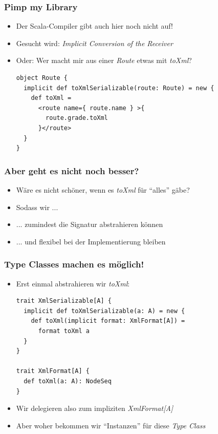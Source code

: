 \documentclass{beamer}
\begin{document}
\begin{frame}[fragile]
  \frametitle{Pimp my Library}
  \begin{itemize}
    \item Der Scala-Compiler gibt auch hier noch nicht auf!
    \item Gesucht wird: \emph{Implicit Conversion of the Receiver}
    \item Oder: Wer macht mir aus einer \emph{Route} etwas mit \emph{toXml}?
    \begin{lstlisting}
object Route {
  implicit def toXmlSerializable(route: Route) = new {
    def toXml =
      <route name={ route.name } >{ 
        route.grade.toXml
      }</route>
  }
}
    \end{lstlisting}
  \end{itemize}
\end{frame}

\begin{frame}[fragile]
  \frametitle{Aber geht es nicht noch besser?}
  \begin{itemize}
    \item W\"are es nicht sch\"oner, wenn es \emph{toXml} f\"ur ``alles'' g\"abe?
    \item Sodass wir ... 
    \item ... zumindest die Signatur abstrahieren k\"onnen
    \item ... und flexibel bei der Implementierung bleiben
  \end{itemize}
\end{frame}

\begin{frame}[fragile]
  \frametitle{Type Classes machen es m\"oglich!}
  \begin{itemize}
    \item Erst einmal abstrahieren wir \emph{toXml}:
    \begin{lstlisting}
trait XmlSerializable[A] {
  implicit def toXmlSerializable(a: A) = new {
    def toXml(implicit format: XmlFormat[A]) =
      format toXml a
  }
}

trait XmlFormat[A] {
  def toXml(a: A): NodeSeq
}
    \end{lstlisting}
    \item Wir delegieren also zum impliziten \emph{XmlFormat[A]}
    \item Aber woher bekommen wir ``Instanzen'' f\"ur diese \emph{Type Class}
  \end{itemize}
\end{frame}
\end{document}
